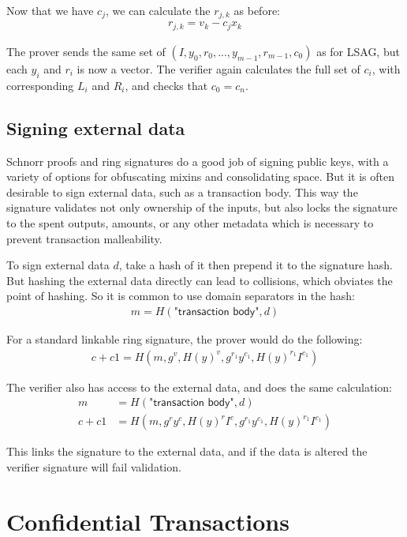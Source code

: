 \documentclass{article}
\begin{document}
Now that we have $c_j$, we can calculate the $r_{j,k}$ as before:
\begin{align}
  r_{j,k} = v_k - c_j x_k
\end{align}

The prover sends the same set of $(I, y_0, r_0, ..., y_{m-1}, r_{m-1}, c_0)$ as for LSAG, but each $y_i$ and $r_i$ is now a vector.  The verifier again calculates the full set of $c_i$, with corresponding $L_i$ and $R_i$, and checks that $c_0 = c_n$.


\subsection{Signing external data}

Schnorr proofs and ring signatures do a good job of signing public keys, with a variety of options for obfuscating mixins and consolidating space.  But it is often desirable to sign external data, such as a transaction body.  This way the signature validates not only ownership of the inputs, but also locks the signature to the spent outputs, amounts, or any other metadata which is necessary to prevent transaction malleability.

To sign external data $d$, take a hash of it then prepend it to the signature hash.  But hashing the external data directly can lead to collisions, which obviates the point of hashing.  So it is common to use domain separators in the hash:
\begin{align}
  m = H(\textsf{"transaction body"}, d)
\end{align}

For a standard linkable ring signature, the prover would do the following:
\begin{align}
  c + c1 = H(m, g^v, H(y)^v, g^{r_1} y^{c_1}, H(y)^{r_1} I^{c_1})
\end{align}

The verifier also has access to the external data, and does the same calculation:
\begin{align}
  m &= H(\textsf{"transaction body"}, d)\\
  c+c1 &= H(m, g^r y^c, H(y)^r I^c, g^{r_1} y^{c_1}, H(y)^{r_1} I^{c_1})
\end{align}

This links the signature to the external data, and if the data is altered the verifier signature will fail validation.



\section{Confidential Transactions}
\end{document}
